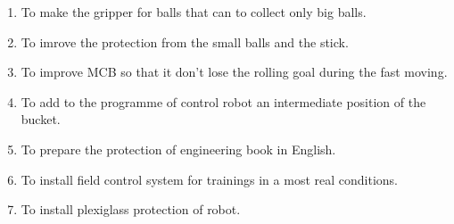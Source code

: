 \begin{enumerate}
\begin{enumerate}
  	\item To make the gripper for balls that can to collect only big balls.
  	
  	\item To imrove the protection from the small balls and the stick.
  	
  	\item To improve MCB so that it don't lose the rolling goal during the fast moving.
  	
  	\item To add to the programme of control robot an intermediate position of the bucket.
  	
  	\item To prepare the protection of engineering book in English.
  	  	
  	\item To install field control system for trainings in a most real conditions.
  	
  	\item To install plexiglass protection of robot.
  	
  \end{enumerate}
  
\end{enumerate}
\fillpage